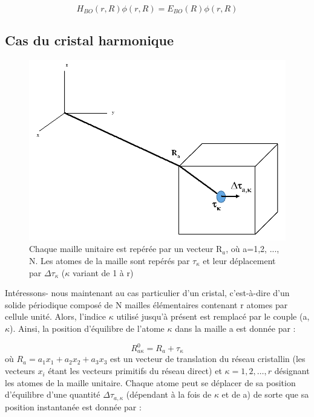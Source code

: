 \begin{equation}
H_{BO}(r,R)\phi(r,R) = E_{BO}(R)\phi(r,R)
\end{equation}

\subsection{Cas du cristal harmonique}

\begin{figure}[H]
	\centering
	\includegraphics[scale=0.7]{image/figsolid}
	\caption[Chaque maille unitaire est repérée par un vecteur R$_{a}$]{Chaque maille unitaire est repérée par un vecteur R$_{a}$, où a=1,2, ..., N. Les atomes de la maille sont repérés par $\tau_{\kappa}$ et leur déplacement par $\Delta\tau_{\kappa}$ ($\kappa$ variant de 1 à r)}
\end{figure}

Intéressons- nous maintenant au cas particulier d'un cristal, c'est-à-dire d'un solide périodique composé de N mailles élémentaires contenant r atomes par cellule unité. Alors, l'indice $\kappa$ utilisé jusqu'à présent est remplacé par le couple (a,$\kappa$). Ainsi, la position d'équilibre de l'atome $\kappa$ dans la maille a est donnée par :

\begin{equation}
R_{a\kappa}^{0}= R_{a} + \tau_{\kappa}
\end{equation}
où $R_{a}=a_{1}x_{1} + a_{2}x_{2} + a_{3}x_{3}$ est un vecteur de translation du réseau cristallin (les vecteurs $x_{i}$ étant les vecteurs primitifs du réseau direct) et $\kappa = 1, 2,\ldots,r$ désignant les atomes de la maille unitaire. Chaque atome peut se déplacer de sa position d'équilibre d'une quantité $\Delta\tau_{a,\kappa}$ (dépendant à la fois de $\kappa$ et de a) de sorte que sa position instantanée est donnée par :

